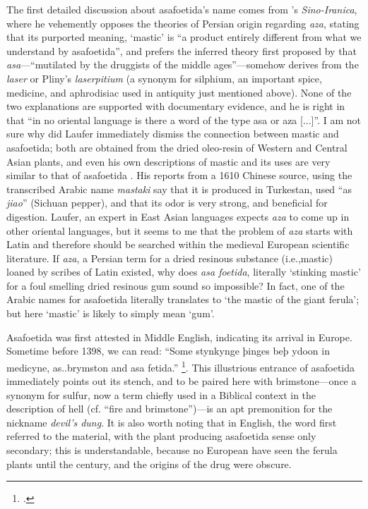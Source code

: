 The first detailed discussion about asafoetida's name comes from \autocite[353-362]{laufer_sino-iranica_1919}'s \textit{Sino-Iranica}, where he vehemently opposes the theories of Persian origin regarding \textit{aza}, stating that its purported meaning, `mastic' is ``a product entirely different from what we understand by asafoetida'', and prefers the inferred theory first proposed by \textcite[41]{garcia_da_orta_colloquies_1913} that \textit{asa}---``mutilated by the druggists of the middle ages''---somehow derives from the \textit{laser} or Pliny's \textit{laserpitium} (a synonym for silphium, an important spice, medicine, and aphrodisiac used in antiquity just mentioned above). None of the two explanations are supported with documentary evidence, and he is right in that ``in no oriental language is there a word of the type asa or aza [...]''. I am not sure why did Laufer immediately dismiss the connection between mastic and asafoetida; both are obtained from the dried oleo-resin of Western and Central Asian plants, and even his own descriptions of mastic and its uses are very similar to that of asafoetida \autocite[252]{laufer_sino-iranica_1919}. His reports from a 1610 Chinese source, using the transcribed Arabic name \textit{mastaki} say that it is produced in Turkestan, used ``as \textit{jiao}'' (Sichuan pepper), and that its odor is very strong, and beneficial for digestion. Laufer, an expert in East Asian languages expects \textit{aza} to come up in other oriental languages, but it seems to me that the problem of \textit{aza} starts with Latin and therefore should be searched within the medieval European scientific literature. If \textit{aza}, a Persian term for a dried resinous substance (i.e.,mastic) loaned by scribes of Latin existed, why does \textit{asa foetida}, literally `stinking mastic' for a foul smelling dried resinous gum sound so impossible? In fact, one of the Arabic names for asafoetida literally translates to `the mastic of the giant ferula'; but here `mastic' is likely to simply mean `gum'.

Asafoetida was first attested in Middle English, indicating its arrival in Europe. Sometime before 1398, we can read: ``Some stynkynge þinges beþ ydoon in medicyne, as..brymston and asa fetida.'' \footcite[asafoetida]{oed}. This illustrious entrance of asafoetida immediately points out its stench, and to be paired here with brimstone---once a synonym for sulfur, now a term chiefly used in a Biblical context in the description of hell (cf. ``fire and brimstone'')---is an apt premonition for the nickname \textit{devil's dung}. It is also worth noting that in English, the word first referred to the material, with the plant producing asafoetida sense only secondary; this is understandable, because no European have seen the ferula plants until the  century, and the origins of the drug were obscure.

